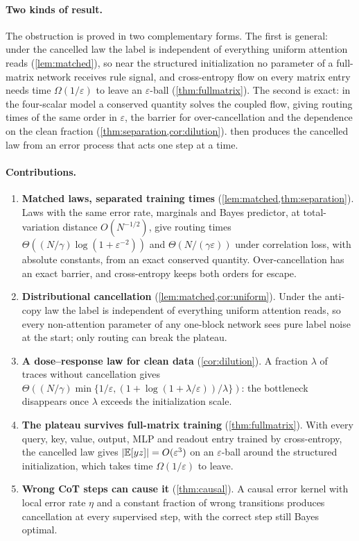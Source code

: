 \paragraph{Two kinds of result.} The obstruction is proved in two complementary forms. The first is general: under the cancelled law the label is
independent of everything uniform attention reads (\cref{lem:matched}), so near the structured initialization no parameter of a full-matrix network
receives rule signal, and cross-entropy flow on every matrix entry needs time $\Omega(1/\varepsilon)$ to leave an $\varepsilon$-ball (\cref{thm:fullmatrix}).
The second is exact: in the four-scalar model a conserved quantity solves the coupled flow, giving routing times of the same order in $\varepsilon$, the barrier
for over-cancellation and the dependence on the clean fraction (\cref{thm:separation,cor:dilution}).  then produces the cancelled law
from an error process that acts one step at a time.

\paragraph{Contributions.}
\begin{enumerate}[leftmargin=*,itemsep=2pt,topsep=2pt]
\item \textbf{Matched laws, separated training times} (\cref{lem:matched,thm:separation}). Laws with the same error rate, marginals and Bayes predictor,
at total-variation distance $O(N^{-1/2})$, give routing times $\Theta((N/\gamma)\log(1+\varepsilon^{-2}))$ and $\Theta(N/(\gamma\varepsilon))$ under correlation loss,
with absolute constants, from an exact conserved quantity. Over-cancellation has an exact barrier, and cross-entropy keeps both orders for escape.
\item \textbf{Distributional cancellation} (\cref{lem:matched,cor:uniform}). Under the anti-copy law the label is independent of everything uniform attention reads,
so every non-attention parameter of any one-block network sees pure label noise at the start; only routing can break the plateau.
\item \textbf{A dose--response law for clean data} (\cref{cor:dilution}). A fraction $\lambda$ of traces without cancellation gives
$\Theta((N/\gamma)\min\{1/\varepsilon,(1+\log(1+\lambda/\varepsilon))/\lambda\})$: the bottleneck disappears once $\lambda$ exceeds the initialization scale.
\item \textbf{The plateau survives full-matrix training} (\cref{thm:fullmatrix}). With every query, key, value, output, MLP and readout entry trained by
cross-entropy, the cancelled law gives $|\mathbb E[yz]|=O(\varepsilon^3)$ on an $\varepsilon$-ball around the structured initialization, which takes time $\Omega(1/\varepsilon)$ to leave.
\item \textbf{Wrong CoT steps can cause it} (\cref{thm:causal}). A causal error kernel with local error rate $\eta$ and a constant fraction of wrong transitions
produces cancellation at every supervised step, with the correct step still Bayes optimal.
\end{enumerate}

